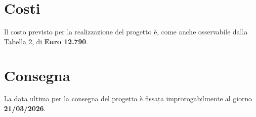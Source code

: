 \documentclass[a4paper,11pt]{article}
\begin{document}
\newpage

\section{Costi}
Il costo previsto per la realizzazione del progetto è, come anche osservabile dalla \hyperref[tab:costi-ruoli]{\textcolor{secondaryblue}{Tabella 2}}, di \textbf{Euro 12.790}.

\section{Consegna}
La data ultima per la consegna del progetto è fissata improrogabilmente al giorno \textbf{21/03/2026}.
\end{document}

